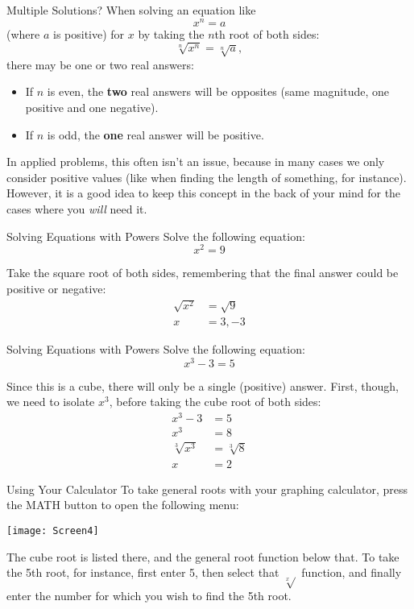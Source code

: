 \begin{proc}{Multiple Solutions?}
When solving an equation like \[x^n = a\] (where $a$ is positive) for $x$ by taking the $n$th root of both sides:
\[\sqrt[n]{x^n} = \sqrt[n]{a},\] there may be one or two real answers:
\begin{itemize}
\item If $n$ is even, the \textbf{two} real answers will be opposites (same magnitude, one positive and one negative).
\item If $n$ is odd, the \textbf{one} real answer will be positive.
\end{itemize}
\end{proc}

In applied problems, this often isn't an issue, because in many cases we only consider positive values (like when finding the length of something, for instance).  However, it is a good idea to keep this concept in the back of your mind for the cases where you \emph{will} need it.

\begin{example}{Solving Equations with Powers}
Solve the following equation:
\[x^2 = 9\]

\sol
Take the square root of both sides, remembering that the final answer could be positive or negative:
\begin{align*}
\sqrt{x^2} &= \sqrt{9}\\
x &= \boxed{3,-3}
\end{align*}
\end{example}

\begin{example}{Solving Equations with Powers}
Solve the following equation:
\[x^3 - 3 = 5\]

\sol
Since this is a cube, there will only be a single (positive) answer.  First, though, we need to isolate $x^3$, before taking the cube root of both sides:
\begin{align*}
x^3 - 3 &= 5\\
x^3 &= 8\\
\sqrt[3]{x^3} &= \sqrt[3]{8}\\
x &= \boxed{2}
\end{align*}
\end{example}

\begin{proc}{Using Your Calculator}
To take general roots with your graphing calculator, press the MATH button to open the following menu:
\begin{center}
\texttt{[image: Screen4]}
\end{center}
The cube root is listed there, and the general root function below that.  To take the 5th root, for instance, first enter 5, then select that $\sqrt[x]{}$ function, and finally enter the number for which you wish to find the 5th root.
\end{proc}

